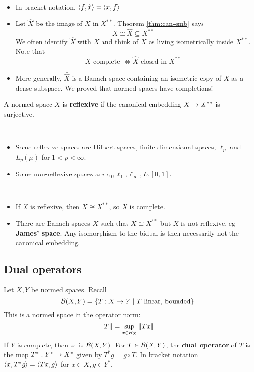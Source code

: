\documentclass{article}
\begin{document}
\begin{rmks}~
  \begin{itemize}
    \item In bracket notation, $\left\langle f, \hat x\right\rangle = \left\langle x, f\right\rangle$
    \item Let $\hat X$ be the image of $X$ in $X^{**}$. Theorem \ref{thm:can-emb} says
      $$X \cong \hat X \subseteq X^{**}$$
      We often identify $\hat X$ with $X$ and think of $X$ as living isometrically inside $X^{**}$. Note that
      $$X \text{ complete } \iff \hat X \text{ closed in } X^{**}$$
    \item More generally, $\bar{\hat X}$ is a Banach space containing an isometric copy of $X$ as a dense subspace. We proved that normed spaces have completions!
  \end{itemize}
\end{rmks}

\begin{defi}
  A normed space $X$ is {\bf reflexive} if the canonical embedding $X \rightarrow X^{**}$ is surjective.
\end{defi}

\begin{egs}~
  \begin{itemize}
    \item Some reflexive spaces are Hilbert spaces, finite-dimensional spaces, $\ell_p$ and $L_p(\mu)$ for $1 < p < \infty$.
    \item Some non-reflexive spaces are $c_0, \ell_1, \ell_\infty, L_1[0, 1]$.
  \end{itemize}
\end{egs}

\begin{rmks}~
  \begin{itemize}
  \item If $X$ is reflexive, then $X \cong X^{**}$, so $X$ is complete.
  \item There are Banach spaces $X$ such that $X \cong X^{**}$ but $X$ is not reflexive, eg {\bf James' space}. Any isomorphism to the bidual is then necessarily not the canonical embedding.
  \end{itemize}
\end{rmks}

\subsection{Dual operators}

\newlec

Let $X, Y$ be normed spaces. Recall
$$\mathcal B(X, Y) = \{T : X \rightarrow Y \mid T \text{ linear, bounded}\}$$
This is a normed space in the operator norm:
$$\left\lVert T\right\rVert = \sup_{x \in B_X} \left\lVert Tx\right\rVert$$
If $Y$ is complete, then so is $\mathcal B(X, Y)$. For $T \in \mathcal B(X, Y)$, the {\bf dual operator} of $T$ is the map $T^* : Y^* \rightarrow X^*$ given by $T^*g = g \circ T$. In bracket notation $\left\langle x, T^*g\right\rangle = \left\langle Tx, g\right\rangle$ for $x \in X, g \in Y^*$.
\end{document}
